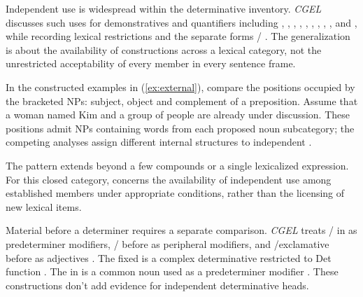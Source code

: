 \documentclass[12pt]{article}
\begin{document}
Independent use is widespread within the determinative inventory. \textit{CGEL} discusses such uses for demonstratives and quantifiers including , , , , , , , , ,  and , while recording lexical restrictions and the separate forms / \citep[371--372, 410--424]{huddleston2002}. The generalization is about the availability of constructions across a lexical category, not the unrestricted acceptability of every member in every sentence frame.

In the constructed examples in (\ref{ex:external}), compare the positions occupied by the bracketed NPs: subject, object and complement of a preposition. Assume that a woman named Kim and a group of people are already under discussion. These positions admit NPs containing words from each proposed noun subcategory; the competing analyses assign different internal structures to independent .

\begin{samepage}
\ea\label{ex:external}
\ea {}\qquad {}\qquad {}
\ex {}\qquad {}\qquad {}
\ex {}\qquad {}\qquad {}
\ex {}\qquad {}\qquad {}
\z\z
\end{samepage}

The pattern extends beyond a few compounds or a single lexicalized expression. For this closed category,  concerns the availability of independent use among established members under appropriate conditions, rather than the licensing of new lexical items.

Material before a determiner requires a separate comparison. \textit{CGEL} treats / in  as predeterminer modifiers, / before  as peripheral modifiers, and /exclamative  before  as adjectives \citep[433--437]{huddleston2002}. The fixed  is a complex determinative restricted to Det function \citep[394]{huddleston2002}. The  in  is a common noun used as a predeterminer modifier \citep[434]{huddleston2002}. These constructions don't add evidence for independent determinative heads.
\end{document}
